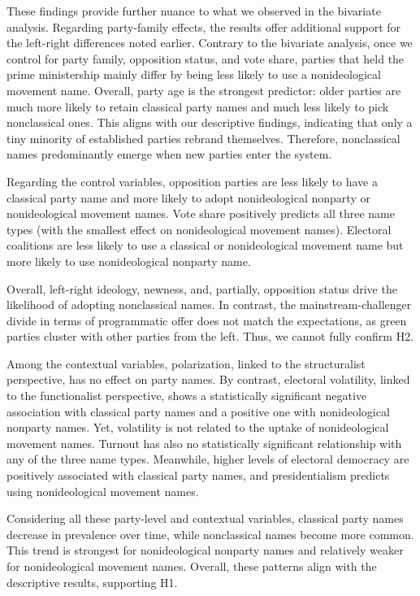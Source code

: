 \documentclass[12pt]{article}
\begin{document}
These findings provide further nuance to what we observed in the bivariate analysis. Regarding party-family effects, the results offer additional support for the left-right differences noted earlier. Contrary to the bivariate analysis, once we control for party family, opposition status, and vote share, parties that held the prime ministership mainly differ by being less likely to use a nonideological movement name. Overall, party age is the strongest predictor: older parties are much more likely to retain classical party names and much less likely to pick nonclassical ones. This aligns with our descriptive findings, indicating that only a tiny minority of established parties rebrand themselves. Therefore, nonclassical names predominantly emerge when new parties enter the system.

Regarding the control variables, opposition parties are less likely to have a classical party name and more likely to adopt nonideological nonparty or nonideological movement names. Vote share positively predicts all three name types (with the smallest effect on nonideological movement names). Electoral coalitions are less likely to use a classical or nonideological movement name but more likely to use nonideological nonparty name.

Overall, left-right ideology, newness, and, partially, opposition status drive the likelihood of adopting nonclassical names. In contrast, the mainstream-challenger divide in terms of programmatic offer does not match the expectations, as green parties cluster with other parties from the left. Thus, we cannot fully confirm H2.

Among the contextual variables, polarization, linked to the structuralist perspective, has no effect on party names. By contrast, electoral volatility, linked to the functionalist perspective, shows a statistically significant negative association with classical party names and a positive one with nonideological nonparty names. Yet, volatility is not related to the uptake of nonideological movement names. Turnout has also no statistically significant relationship with any of the three name types. Meanwhile, higher levels of electoral democracy are positively associated with classical party names, and presidentialism predicts using nonideological movement names.

Considering all these party-level and contextual variables, classical party names decrease in prevalence over time, while nonclassical names become more common. This trend is strongest for nonideological nonparty names and relatively weaker for nonideological movement names. Overall, these patterns align with the descriptive results, supporting H1.
\end{document}
